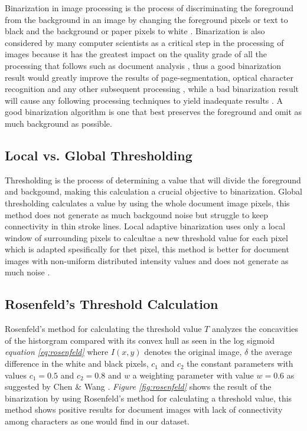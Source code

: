 \documentclass[11pt]{article}
\begin{document}
  		Binarization in image processing is the process of discriminating the foreground from the background in an image by changing the foreground pixels or text to black and the background or paper pixels to white \cite{ntogas2008binarization}. Binarization is also considered by many computer scientists as a critical step in the processing of images because it has the greatest impact on the quality grade of all the processing that follows such as document analysis \cite{jacob2014survey}, thus a good binarization result would greatly improve the results of page-segmentation, optical character recognition and any other subsequent processing \cite{agrawal2011stroke}, while a bad binarization result will cause any following processing techniques to yield inadequate results \cite{howe2011laplacian}. A good binarization algorithm is one that best preserves the foreground and omit as much background as possible.\\

			\subsection{Local vs. Global Thresholding}
				Thresholding is the process of determining a value that will divide the foreground and backgound, making this calculation a crucial objective to binarization. Global thresholding calculates a value by using the whole document image pixels, this method does not generate as much backgound noise but struggle to keep connectivity in thin stroke lines. Local adaptive binarization uses only a local window of surrounding pixels to calcultae a new threshold value for each pixel which is adapted spesifically for thet pixel, this method is better for document images with non-uniform distributed intensity values and does not generate as much noise \cite{chen2017broken}.

			\subsection{Rosenfeld's Threshold Calculation}
				Rosenfeld's method for calculating the threshold value $T$ analyzes the concavities of the historgram compared with its convex hull as seen in the log sigmoid \textit{equation \ref{eq:rosenfeld}} \cite{chen2017broken} where $I(x,y)$ denotes the original image, $\delta$ the average difference in the white and black pixels, $c_1$ and $c_2$ the constant parameters with values $c_1=0.5$ and $c_2=0.8$ and $w$ a weighting parameter with value $w=0.6$ as suggested by Chen \& Wang  \cite{chen2017broken}. \textit{Figure \ref{fig:rosenfeld}} shows the result of the binarization by using Rosenfeld's method for calculating a threshold value, this method shows positive results for document images with lack of connectivity among characters as one would find in our dataset.
\end{document}
